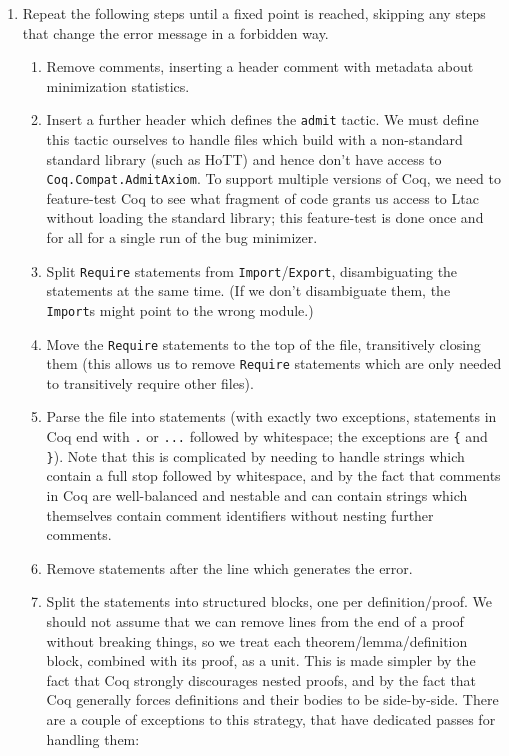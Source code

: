 \documentclass[a4paper,USenglish,cleveref,autoref,thm-restate]{lipics-v2021}
\begin{document}
\begin{enumerate}
\item Repeat the following steps until a fixed point is reached, skipping any steps that change the error message in a forbidden way.
\begin{enumerate}
\item Remove comments, inserting a header comment with metadata about minimization statistics.
\item Insert a further header which defines the \verb|admit| tactic.
  We must define this tactic ourselves to handle files which build with a non-standard standard library (such as HoTT) and hence don't have access to \verb|Coq.Compat.AdmitAxiom|.
  To support multiple versions of Coq, we need to feature-test Coq to see what fragment of code grants us access to Ltac without loading the standard library; this feature-test is done once and for all for a single run of the bug minimizer.
\item Split \verb|Require| statements from \verb|Import|/\verb|Export|, disambiguating the statements at the same time.
  (If we don't disambiguate them, the \verb|Import|s might point to the wrong module.)
\item Move the \verb|Require| statements to the top of the file, transitively closing them (this allows us to remove \verb|Require| statements which are only needed to transitively require other files).
\item Parse the file into statements (with exactly two exceptions, statements in Coq end with \verb|.| or \verb|...| followed by whitespace; the exceptions are \verb|{| and \verb|}|).
  Note that this is complicated by needing to handle strings which contain a full stop followed by whitespace, and by the fact that comments in Coq are well-balanced and nestable and can contain strings which themselves contain comment identifiers without nesting further comments.
\item Remove statements after the line which generates the error.
\item Split the statements into structured blocks, one per definition/proof.
  We should not assume that we can remove lines from the end of a proof without breaking things, so we treat each theorem/lemma/definition block, combined with its proof, as a unit.
  This is made simpler by the fact that Coq strongly discourages nested proofs, and by the fact that Coq generally forces definitions and their bodies to be side-by-side.
  There are a couple of exceptions to this strategy, that have dedicated passes for handling them:

\end{enumerate}
\end{enumerate}
\end{document}
